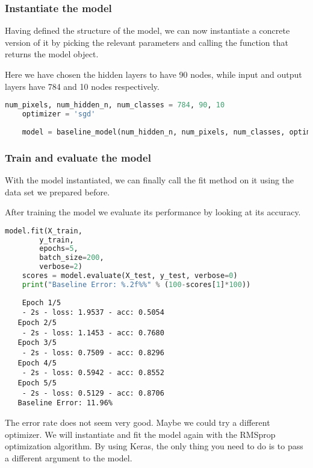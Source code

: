 \subsubsection{Instantiate the model}

Having defined the structure of the model, we can now instantiate a concrete version of it by picking the relevant parameters and calling the function that returns the model object.

Here we have chosen the hidden layers to have 90 nodes, while input and output layers have 784 and 10 nodes respectively. 

\begin{lstlisting}[language=Python]
    num_pixels, num_hidden_n, num_classes = 784, 90, 10
    optimizer = 'sgd'
    
    model = baseline_model(num_hidden_n, num_pixels, num_classes, optimizer)
\end{lstlisting}

\subsubsection{Train and evaluate the model}

With the model instantiated, we can finally call the fit method on it using the data set we prepared before.

After training the model we evaluate its performance by looking at its accuracy.

\begin{lstlisting}[language=Python]
    model.fit(X_train,
        y_train, 
        epochs=5,
        batch_size=200,
        verbose=2)
    scores = model.evaluate(X_test, y_test, verbose=0)
    print("Baseline Error: %.2f%%" % (100-scores[1]*100))
\end{lstlisting}

\begin{lstlisting}
    Epoch 1/5
    - 2s - loss: 1.9537 - acc: 0.5054
   Epoch 2/5
    - 2s - loss: 1.1453 - acc: 0.7680
   Epoch 3/5
    - 2s - loss: 0.7509 - acc: 0.8296
   Epoch 4/5
    - 2s - loss: 0.5942 - acc: 0.8552
   Epoch 5/5
    - 2s - loss: 0.5129 - acc: 0.8706
   Baseline Error: 11.96%
\end{lstlisting}

The error rate does not seem very good. Maybe we could try a different optimizer. We will instantiate and fit the model again with the RMSprop optimization algorithm. By using Keras, the only thing you need to do is to pass a different argument to the model.

